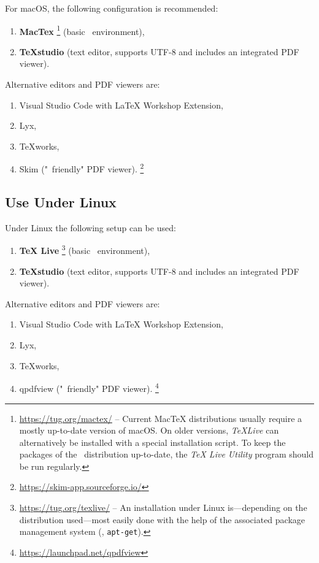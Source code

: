 For macOS, the following configuration is recommended:
%
\begin{enumerate}
\item 
	\textbf{MacTex}%
	\footnote{\url{https://tug.org/mactex/} -- 
	Current MacTeX distributions usually require a mostly up-to-date version of macOS. 
	On older versions, \emph{TeXLive} can alternatively be installed with a special
	installation script. To keep the packages of the \latex\ distribution up-to-date, the 
	\emph{TeX Live Utility} program should be run regularly.}
	(basic \latex\ environment),
\item \textbf{TeXstudio} (text editor, supports UTF-8 and includes an integrated PDF viewer).
\end{enumerate}
%
Alternative editors and PDF viewers are:
%
\begin{enumerate}
	\item Visual Studio Code with LaTeX Workshop Extension,%
	\item Lyx,%
	\item TeXworks,%
	\item Skim ("\latex\ friendly" PDF viewer).%
	\footnote{\url{https://skim-app.sourceforge.io/}}
\end{enumerate}


\subsection{Use Under Linux}

Under Linux the following setup can be used:
%
\begin{enumerate}
	\item 
	\textbf{TeX Live}%
	\footnote{\url{https://tug.org/texlive/} -- An installation under Linux is---depending
	on the distribution used---most easily done with the help of the associated package
	management system (\eg, \texttt{apt-get}).}
	(basic \latex\ environment),
	\item \textbf{TeXstudio} (text editor, supports UTF-8 and includes an
	integrated PDF viewer).
\end{enumerate}
%
Alternative editors and PDF viewers are:
%
\begin{enumerate}
	\item Visual Studio Code with LaTeX Workshop Extension,%
	\item Lyx,%
	\item TeXworks,%
	\item qpdfview ("\latex\ friendly" PDF viewer).%
	\footnote{\url{https://launchpad.net/qpdfview}}
\end{enumerate}


